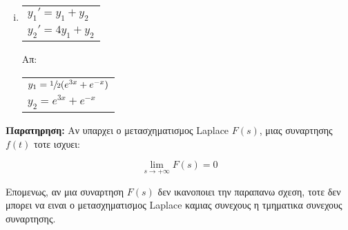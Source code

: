 \begin{enumerate}
\begin{enumerate}[i)]

\item \begin{tabular}{l} $y_1'=y_1+y_2$ \\ $y_2'=4y_1+y_2$\end{tabular} \hfill Απ: \begin{tabular}{l} $y_1=\sfrac{1}{2}(e^{3x}+e^{-x})$ \\ $y_2=e^{3x}+e^{-x}$\end{tabular}


\end{enumerate}

\end{enumerate}

\vspace{\baselineskip}

\textbf{Παρατηρηση:} Αν υπαρχει ο μετασχηματισμος \textlatin{Laplace} $F(s)$, μιας συναρτησης $f(t)$ τοτε ισχυει:

\[
\lim\limits_{s\to+\infty}F(s)=0
\]

Επομενως, αν μια συναρτηση $F(s)$ δεν ικανοποιει την παραπανω σχεση, τοτε δεν μπορει να ειναι ο μετασχηματισμος \textlatin{Laplace} καμιας συνεχους η τμηματικα συνεχους συναρτησης.




